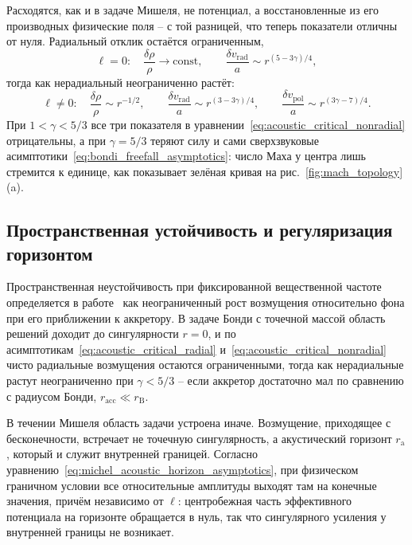 \documentclass[12pt,a4paper,preprint,nopreprintline]{elsarticle}
\begin{document}
Расходятся, как и в задаче Мишеля, не потенциал, а восстановленные из его производных физические поля -- с той разницей, что теперь показатели отличны от нуля. Радиальный отклик остаётся ограниченным,
\begin{equation}
    \ell=0:
    \quad
    \frac{\delta\rho}{\rho}
    \longrightarrow\mathrm{const},
    \qquad
    \frac{\delta v_{\mathrm{rad}}}{a}
    \sim r^{(5-3\gamma)/4},
    \label{eq:acoustic_critical_radial}
\end{equation}
тогда как нерадиальный неограниченно растёт:
\begin{equation}
    \ell\neq0:
    \quad
    \frac{\delta\rho}{\rho}
    \sim r^{-1/2},
    \qquad
    \frac{\delta v_{\mathrm{rad}}}{a}
    \sim r^{(3-3\gamma)/4},
    \qquad
    \frac{\delta v_{\mathrm{pol}}}{a}
    \sim r^{(3\gamma-7)/4}.
    \label{eq:acoustic_critical_nonradial}
\end{equation}
При $1<\gamma<5/3$ все три показателя в уравнении~\eqref{eq:acoustic_critical_nonradial} отрицательны, а при $\gamma=5/3$ теряют силу и сами сверхзвуковые асимптотики~\eqref{eq:bondi_freefall_asymptotics}: число Маха у центра лишь стремится к единице, как показывает зелёная кривая на рис.~\ref{fig:mach_topology}(a).

\subsection{Пространственная устойчивость и регуляризация горизонтом}
\label{sec:acoustic_stability}

Пространственная неустойчивость при фиксированной вещественной частоте определяется в работе~\cite{KovalenkoIG_EreminMA_SpatialInstabilityOfSphericalAccretion_1998} как неограниченный рост возмущения относительно фона при его приближении к аккретору. В задаче Бонди с точечной массой область решений доходит до сингулярности $r=0$, и по асимптотикам~\eqref{eq:acoustic_critical_radial} и~\eqref{eq:acoustic_critical_nonradial} чисто радиальные возмущения остаются ограниченными, тогда как нерадиальные растут неограниченно при $\gamma<5/3$ -- если аккретор достаточно мал по сравнению с радиусом Бонди, $r_{\mathrm{acc}}\ll r_{\mathrm{B}}$.

В течении Мишеля область задачи устроена иначе. Возмущение, приходящее с бесконечности, встречает не точечную сингулярность, а акустический горизонт $r_{\mathrm{a}}$, который и служит внутренней границей. Согласно уравнению~\eqref{eq:michel_acoustic_horizon_asymptotics}, при физическом граничном условии все относительные амплитуды выходят там на конечные значения, причём независимо от $\ell$: центробежная часть эффективного потенциала на горизонте обращается в нуль, так что сингулярного усиления у внутренней границы не возникает.
\end{document}
